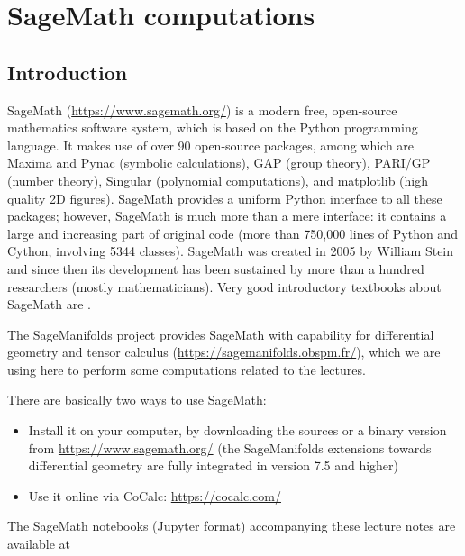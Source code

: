 \chapter{SageMath computations} \label{s:sam}

\minitoc

\section{Introduction}


\textsf{SageMath} (\url{https://www.sagemath.org/}) is a modern free,
open-source mathematics software system, which is
based on the Python programming language. It makes use of over 90 open-source packages,
among which are \textsf{Maxima} and \textsf{Pynac} (symbolic calculations),
\textsf{GAP} (group theory),
\textsf{PARI/GP} (number theory), \textsf{Singular} (polynomial computations),
and \textsf{matplotlib} (high quality 2D figures).
\textsf{SageMath} provides a uniform Python interface to all these packages; however,
\textsf{SageMath} is much more than a mere interface: it contains a large and increasing part of
original code (more than 750,000 lines of Python and Cython, involving 5344 classes).
\textsf{SageMath} was created in 2005 by William Stein \cite{SteinJ05} and since
then its development has been sustained by more than a hundred researchers
(mostly mathematicians). Very good introductory textbooks about \textsf{SageMath} are
\cite{Zimme18,JoyneS14,Bard15}.

The \textsf{SageManifolds} project
provides \textsf{SageMath} with capability for differential geometry and tensor calculus
(\url{https://sagemanifolds.obspm.fr/}), which we are using here to perform
some computations related to the lectures.

There are basically two ways to use \textsf{SageMath}:
\begin{itemize}
\item Install it on your computer, by downloading the sources or a binary version
from \url{https://www.sagemath.org/} (the \textsf{SageManifolds} extensions towards
differential geometry are fully integrated in version 7.5 and higher)
\item Use it online via \textsf{CoCalc}: \url{https://cocalc.com/}
\end{itemize}


The SageMath notebooks (Jupyter format) accompanying these lecture notes are available
at\\

